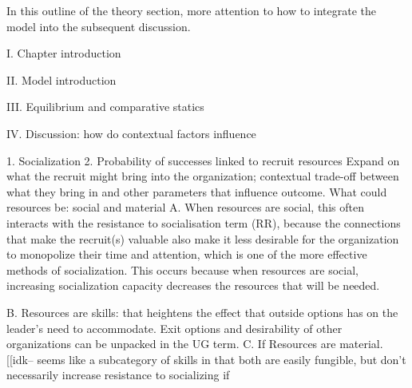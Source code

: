 In this outline of the theory section, more attention to how to integrate the model into the subsequent discussion.

I.  Chapter introduction 

II. Model introduction

III. Equilibrium and comparative statics

IV. Discussion: how do contextual factors influence

1. Socialization
2. Probability of successes linked to recruit resources
Expand on what the recruit might bring into the organization; contextual trade-off between what they bring in and other parameters that influence outcome. 
What could resources be: social and material
    A. When resources are social, this often interacts with the resistance to socialisation term (RR), because the connections that make the recruit(s) valuable also make it less desirable for the organization to monopolize their time and attention, which is one of the more effective methods of socialization. This occurs because when resources are social, increasing socialization capacity decreases the resources that will be needed.
    
    B. Resources are skills: that heightens the effect that outside options has on the leader's need to accommodate. Exit options and desirability of other organizations can be unpacked in the UG term.
    C. If Resources are material. [[idk-- seems like a subcategory 
    of skills in that both are easily fungible, but don't necessarily increase resistance to socializing if